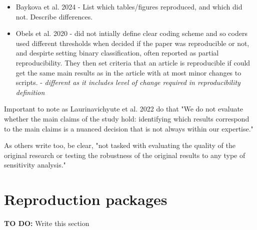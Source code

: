 \begin{itemize}
    \item Baykova et al. 2024 - List which tables/figures reproduced, and which did not. Describe differences.\autocite{baykova_ensuring_2024}
    \item Obels et al. 2020 - did not intially define clear coding scheme and so coders used different thresholds when decided if the paper was reproducible or not, and despirte setting binary classification, often reported as partial reproducibility. They then set criteria that an article is reproducible if could get the same main results as in the article with at most minor changes to scripts.\autocite{obels_analysis_2020} - \textit{different as it includes level of change required in reproducibility definition}
\end{itemize}

Important to note as Laurinavichyute et al. 2022 do that "We do not evaluate whether the main claims of the study hold: identifying which results correspond to the main claims is a nuanced decision that is not always within our expertise."

As others write too, be clear, "not tasked with evaluating the quality of the original research or testing the robustness of the original results to any type of sensitivity analysis."\autocite{wood_push_2018}

\section{Reproduction packages}


\textbf{TO DO:} Write this section
